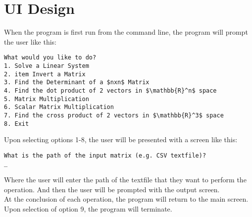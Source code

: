 \documentclass[12pt]{article}
\begin{document}
\section{UI Design}
When the program is first run from the command line, the program will prompt the user like this:\\

\noindent\makebox[\linewidth]{\rule{\paperwidth}{0.4pt}}

\begin{verbatim}
What would you like to do?
1. Solve a Linear System
2. item Invert a Matrix
3. Find the Determinant of a $nxn$ Matrix
4. Find the dot product of 2 vectors in $\mathbb{R}^n$ space
5. Matrix Multiplication
6. Scalar Matrix Multiplication
7. Find the cross product of 2 vectors in $\mathbb{R}^3$ space
8. Exit
\end{verbatim}

\noindent\makebox[\linewidth]{\rule{\paperwidth}{0.4pt}}

Upon selecting options 1-8, the user will be presented with a screen like this: \\

\noindent\makebox[\linewidth]{\rule{\paperwidth}{0.4pt}}

\begin{verbatim}
What is the path of the input matrix (e.g. CSV textfile)?
_
\end{verbatim}

\noindent\makebox[\linewidth]{\rule{\paperwidth}{0.4pt}}
Where the user will enter the path of the textfile that they want to perform the operation.
And then the user will be prompted with the output screen.\\

At the conclusion of each operation, the program will return to the main screen.\\

Upon selection of option 9, the program will terminate.
\end{document}
